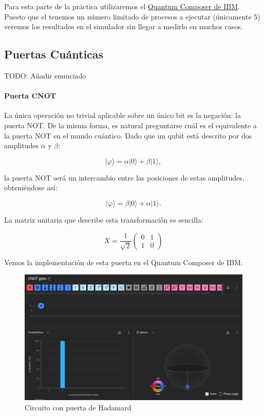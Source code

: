 \documentclass[11pt]{article}
\newcommand{\ra}{\rangle}
\newcommand{\ra}{\rangle}
\begin{document}
Para esta parte de la práctica utilizaremos el \href{https://quantum-computing.ibm.com/composer}{Quantum Composer de IBM}. Puesto que el tenemos un número limitado de procesos a ejecutar (únicamente 5) veremos los resultados en el simulador sin llegar a medirlo en muchos casos.

\subsection{Puertas Cuánticas}

TODO: Añadir enunciado


\paragraph*{Puerta CNOT}

La única operación no trivial aplicable sobre un único bit es la negación: la puerta NOT. De la misma forma, es natural preguntarse cuál es el equivalente a la puerta NOT en el mundo cuántico. Dado que un qubit está descrito por dos amplitudes $\alpha$ y $\beta$:

\[
	|\varphi\ra = \alpha |0\ra + \beta |1\ra,
\]

la puerta NOT será un intercambio entre las posiciones de estas amplitudes, obteniéndose así:

\[
	|\varphi\ra = \beta |0\ra + \alpha |1\ra.
\]

La matriz unitaria que describe esta transformación es sencilla:

\[
X = \frac{1}{\sqrt 2}
\begin{pmatrix}
	0 & 1 \\
	1 & 0 
\end{pmatrix}
\]

Vemos la implementación de esta puerta en el Quantum Composer de IBM:

\begin{figure}[H]
	\centering
	\includegraphics[scale=0.4]{figures/gate-x.png}
	\caption{Circuito con puerta de Hadamard}
\end{figure}
\end{document}

